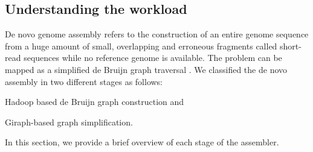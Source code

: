 \documentclass[conference]{IEEEtran}
\begin{document}
\subsection {Understanding the workload} \label{TheWorkload}
De novo genome assembly refers to the construction of an entire genome sequence from a huge amount of small, overlapping and erroneous fragments called short-read sequences while no reference genome is available.
The problem can be mapped as a simplified de Bruijn graph traversal \cite{bio:debruijngraph}. 
We classified the de novo assembly in two different stages as follows:
\begin{inparaenum}
\item Hadoop based de Bruijn graph construction and
\item Giraph-based graph simplification. 
\end{inparaenum}
In this section, we provide a brief overview of each stage of the assembler.
\end{document}
